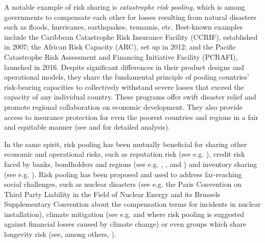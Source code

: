 \documentclass[fleqn,mnsc,nonblindrev]{informs4}
\begin{document}

 {A notable example of risk sharing is {\it catastrophe risk pooling}, which is} among governments to compensate each other for losses resulting from natural disasters such as floods, hurricanes, earthquakes, tsunamis, etc. Best-known examples include the Caribbean Catastrophe Risk Insurance Facility (CCRIF), established in 2007; the African Risk Capacity (ARC), set up in 2012; and the Pacific Catastrophe Risk Assessment and Financing Initiative Facility (PCRAFI), launched in 2016. Despite significant differences in their product designs and operational models, they share the fundamental principle of pooling countries' risk-bearing capacities to collectively withstand severe losses that exceed the capacity of any individual country. These programs offer swift disaster relief and promote regional collaboration on economic development. They also provide access to insurance protection for even the poorest countries and regions in a fair and equitable manner {(see \cite{BolWan} and \cite{feng23} for detailed analysis)}. 

In the same spirit, risk pooling has been mutually beneficial for sharing other economic and operational risks, such as reputation risk (see e.g. \cite{DhingraKrishan21}), credit risk faced by banks, bondholders and    {regions (see e.g. \cite{GiannettiYaseh12}, \cite{ButletGaoUzmanoglu21},  \cite{Ahlin20} and \cite{CarpeSadou00})} and inventory sharing (see e.g. \cite{Govietal21}). Risk pooling has been proposed and used to address far-reaching social challenges, such as nuclear disasters    {(see e.g. the Paris Convention on Third Party Liability in the Field of Nuclear Energy and its Brussels Supplementary Convention about the compensation terms for incidents in nuclear installation), climate mitigation (see e.g. \cite{kotz2024economic} and \cite{schoenmaker2015can} where risk pooling is suggested against financial losses caused by climate change) or even groups which share longevity risk (see, among others, \cite{milevsky2024religious}).}
\end{document}
